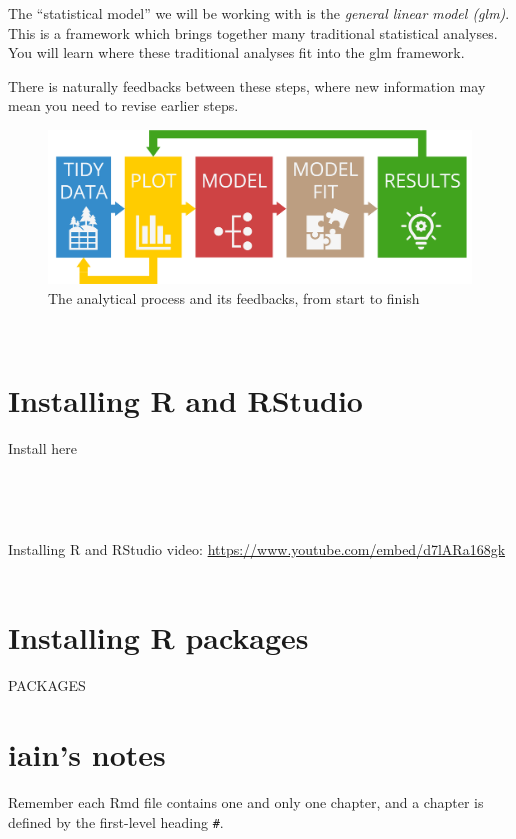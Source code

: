 \documentclass[
]{book}
\begin{document}
The ``statistical model'' we will be working with is the
\emph{general linear model (glm)}. This is a framework which brings together
many traditional statistical analyses. You will learn where these traditional
analyses fit into the glm framework.

There is naturally feedbacks between these steps, where new information may
mean you need to revise earlier steps.\\
\hspace*{0.333em}

\begin{figure}
\centering
\includegraphics{Process.png}
\caption{The analytical process and its feedbacks, from start to finish}
\end{figure}

~

\hypertarget{installing-r-and-rstudio}{%
\section{Installing R and RStudio}\label{installing-r-and-rstudio}}

Install here

~

~

Installing R and RStudio video:
\url{https://www.youtube.com/embed/d7lARa168gk}
~

\hypertarget{installing-r-packages}{%
\section{Installing R packages}\label{installing-r-packages}}

PACKAGES

\hypertarget{iains-notes}{%
\section{iain's notes}\label{iains-notes}}

Remember each Rmd file contains one and only one chapter, and a chapter is defined by the first-level heading \texttt{\#}.
\end{document}
